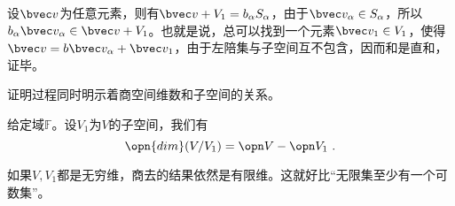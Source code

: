 设$\bvec v$为任意元素，则有$\bvec v+V_1=b_{\alpha} S_{\alpha}$，由于$\bvec v_{\alpha}\in S_{\alpha}$，所以$b_{\alpha} \bvec v_{\alpha}\in\bvec v+V_1$。也就是说，总可以找到一个元素$\bvec v_1\in V_1$，使得$\bvec v=b\bvec v_{\alpha}+\bvec v_1$，由于左陪集与子空间互不包含，因而和是直和，证毕。

证明过程同时明示着商空间维数和子空间的关系。
\begin{theorem}{}
给定域$\mathbb F$。设$V_1$为$V$的子空间，我们有
\begin{equation}
\opn {dim}(V/V_1)=\opn V-\opn V_1~.
\end{equation}
\end{theorem}
如果$V,V_1$都是无穷维，商去的结果依然是有限维。这就好比“无限集至少有一个可数集”。